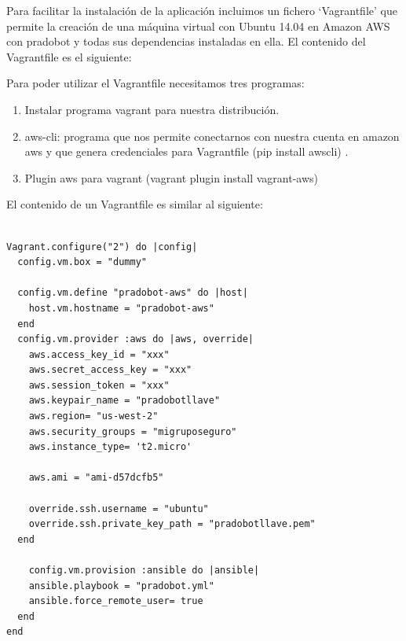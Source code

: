 Para facilitar la instalación de la aplicación incluimos un fichero \enquote*{Vagrantfile} que permite la creación de una máquina virtual con Ubuntu 14.04 en Amazon AWS con pradobot y todas sus dependencias instaladas en ella. El contenido del Vagrantfile es el siguiente:

Para poder utilizar el Vagrantfile necesitamos tres programas: 

\begin{enumerate}
\item Instalar programa vagrant para nuestra distribución.
\item aws-cli: programa que nos permite conectarnos con nuestra cuenta en amazon aws y que genera credenciales para Vagrantfile (pip install awscli) .
\item Plugin aws para vagrant (vagrant plugin install vagrant-aws)
\end{enumerate}

El contenido de un Vagrantfile es similar al siguiente:
\begin{lstlisting}

Vagrant.configure("2") do |config|
  config.vm.box = "dummy"

  config.vm.define "pradobot-aws" do |host|
    host.vm.hostname = "pradobot-aws"
  end
  config.vm.provider :aws do |aws, override|
    aws.access_key_id = "xxx"
    aws.secret_access_key = "xxx"
    aws.session_token = "xxx"
    aws.keypair_name = "pradobotllave"
    aws.region= "us-west-2"
    aws.security_groups = "migruposeguro"
    aws.instance_type= 't2.micro'
   
    aws.ami = "ami-d57dcfb5"

    override.ssh.username = "ubuntu"
    override.ssh.private_key_path = "pradobotllave.pem"
  end
  
    config.vm.provision :ansible do |ansible|
	ansible.playbook = "pradobot.yml"
	ansible.force_remote_user= true
  end
end
 
\end{lstlisting}

